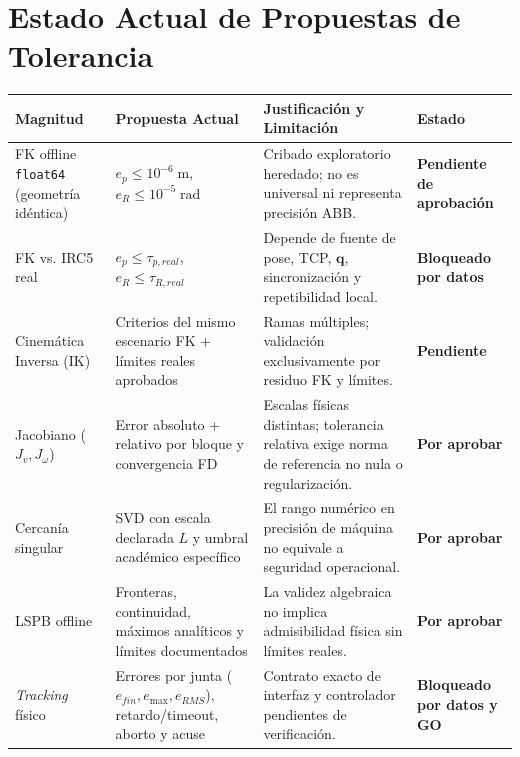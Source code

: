 \documentclass[10.5pt, a4paper]{article}
\begin{document}
\section{Estado Actual de Propuestas de Tolerancia}
\begingroup
\scriptsize
\setlength{\tabcolsep}{3.5pt}
\renewcommand{\arraystretch}{1.35}
\noindent\begin{tabularx}{\textwidth}{|>{\hsize=0.90\hsize\raggedright\arraybackslash}X|>{\hsize=1.05\hsize\raggedright\arraybackslash}X|>{\hsize=1.20\hsize\raggedright\arraybackslash}X|>{\hsize=0.85\hsize\raggedright\arraybackslash}X|}
\hline
\rowcolor{ucbblue!15}
\textbf{Magnitud} & \textbf{Propuesta Actual} & \textbf{Justificación y Limitación} & \textbf{Estado} \\ \hline
FK offline \texttt{float64} (geometría idéntica) & $e_p \le 10^{-6}\;\mathrm{m}$, $e_R \le 10^{-5}\;\mathrm{rad}$ & Cribado exploratorio heredado; no es universal ni representa precisión ABB. & \textbf{Pendiente de aprobación} \\ \hline
FK vs. IRC5 real & $e_p \le \tau_{p,real}$, $e_R \le \tau_{R,real}$ & Depende de fuente de pose, TCP, $\mathbf{q}$, sincronización y repetibilidad local. & \textbf{Bloqueado por datos} \\ \hline
Cinemática Inversa (IK) & Criterios del mismo escenario FK + límites reales aprobados & Ramas múltiples; validación exclusivamente por residuo FK y límites. & \textbf{Pendiente} \\ \hline
Jacobiano ($J_v, J_\omega$) & Error absoluto + relativo por bloque y convergencia FD & Escalas físicas distintas; tolerancia relativa exige norma de referencia no nula o regularización. & \textbf{Por aprobar} \\ \hline
Cercanía singular & SVD con escala declarada $L$ y umbral académico específico & El rango numérico en precisión de máquina no equivale a seguridad operacional. & \textbf{Por aprobar} \\ \hline
LSPB offline & Fronteras, continuidad, máximos analíticos y límites documentados & La validez algebraica no implica admisibilidad física sin límites reales. & \textbf{Por aprobar} \\ \hline
\textit{Tracking} físico & Errores por junta ($e_{fin}, e_{\max}, e_{RMS}$), retardo/timeout, aborto y acuse & Contrato exacto de interfaz y controlador pendientes de verificación. & \textbf{Bloqueado por datos y GO} \\ \hline
\end{tabularx}\par
\endgroup
\end{document}

